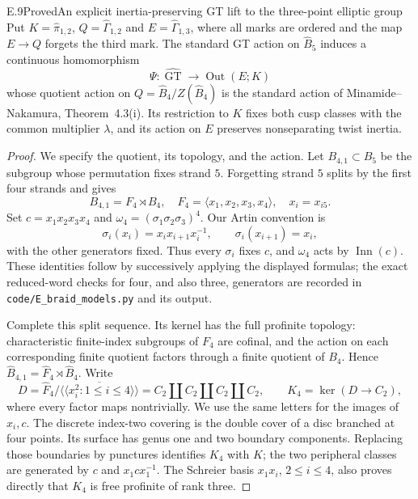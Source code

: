\begin{result}{E.9}{Proved}{An explicit inertia-preserving GT lift to
the three-point elliptic group}
Put $K=\widehat\pi_{1,2}$, $Q=\widehat\Gamma_{1,2}$ and
$E=\widehat\Gamma_{1,3}$, where all marks are ordered and the
map $E\to Q$ forgets the third mark.  The standard GT action on
$\widehat B_5$ induces a continuous homomorphism
\[
 \Psi:\widehat{\operatorname{GT}}\longrightarrow
           \operatorname{Out}(E;K)
                                                               \tag{E.10}
\]
whose quotient action on $Q=\widehat B_4/Z(\widehat B_4)$ is the
standard action of Minamide--Nakamura, Theorem~4.3(i).  Its restriction
to $K$ fixes both cusp classes with the common multiplier $\lambda$,
and its action on $E$ preserves nonseparating twist inertia.
\end{result}
\begin{proof}
We specify the quotient, its topology, and the action.  Let
$B_{4,1}\subset B_5$ be the subgroup whose permutation fixes strand
$5$.  Forgetting strand $5$ splits by the first four strands and gives
\[
 B_{4,1}=F_4\rtimes B_4,
 \quad F_4=\langle x_1,x_2,x_3,x_4\rangle,
 \quad x_i=x_{i5}.
\]
Set $c=x_1x_2x_3x_4$ and $\omega_4=(\sigma_1\sigma_2\sigma_3)^4$.
Our Artin convention is
\[
 \sigma_i(x_i)=x_ix_{i+1}x_i^{-1},\qquad
 \sigma_i(x_{i+1})=x_i,
\]
with the other generators fixed.  Thus every $\sigma_i$ fixes $c$,
and $\omega_4$ acts by $\operatorname{Inn}(c)$.  These identities
follow by successively applying the displayed formulas; the exact
reduced-word checks for four, and also three, generators are recorded
in \texttt{code/E\_braid\_models.py} and its output.

Complete this split sequence.  Its kernel has the full profinite
topology: characteristic finite-index subgroups of $F_4$ are cofinal,
and the action on each corresponding finite quotient factors through
a finite quotient of $B_4$.  Hence
$\widehat B_{4,1}=\widehat F_4\rtimes\widehat B_4$.
Write
\[
 D=\widehat F_4/\overline{\langle\!\langle x_i^2:1\leq i\leq4
                              \rangle\!\rangle}
       =C_2\amalg C_2\amalg C_2\amalg C_2,
 \qquad K_4=\ker(D\to C_2),                               \tag{E.11}
\]
where every factor maps nontrivially.  We use the same letters for
the images of $x_i,c$.  The discrete index-two covering is the double
cover of a disc branched at four points.  Its surface has genus one
and two boundary components.  Replacing those boundaries by punctures
identifies $K_4$ with $K$; the two peripheral classes are generated by
$c$ and $x_1cx_1^{-1}$.  The Schreier basis $x_1x_i$, $2\leq i\leq4$,
also proves directly that $K_4$ is free profinite of rank three.


\end{proof}
